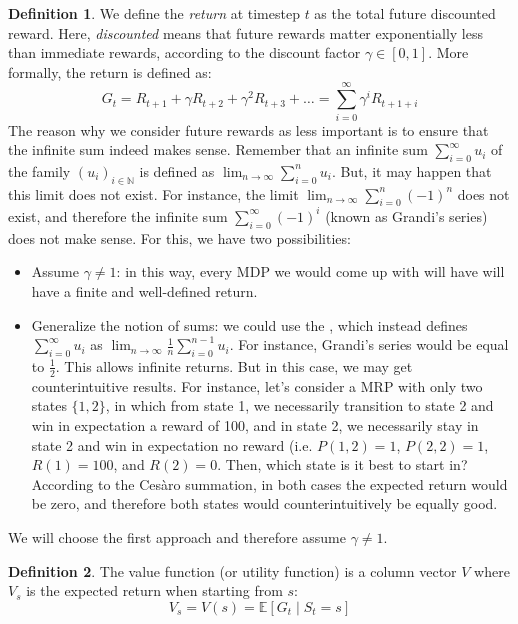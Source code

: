 \documentclass{article}
\theoremstyle{definition}
\newtheorem{definition}{Definition}[section]
\theoremstyle{remark}
\theoremstyle{example}
\begin{document}
\begin{definition}
		We define the \textit{return} at timestep $t$ as the total future discounted reward. Here, \textit{discounted} means that future rewards matter exponentially less than immediate rewards, according to the discount factor $\gamma \in [0, 1]$. More formally, the return is defined as: 
				$$G_t = R_{t+1} + \gamma R_{t+2} + \gamma^2 R_{t+3} + \dots = \sum_{i=0}^\infty \gamma^i R_{t+1+i}$$
		The reason why we consider future rewards as less important is to ensure that the infinite sum indeed makes sense. Remember that an infinite sum $\sum_{i=0}^\infty u_i$ of the family $(u_i)_{i \in \mathbb{N}}$ is defined as $\lim_{n \rightarrow \infty} \sum_{i=0}^n u_i$. But, it may happen that this limit does not exist. For instance, the limit $\lim_{n \rightarrow \infty} \sum_{i=0}^n (-1)^n$ does not exist, and therefore the infinite sum $\sum_{i=0}^\infty (-1)^i$ (known as Grandi's series) does not make sense. For this, we have two possibilities:
		\begin{itemize}
				\item Assume $\gamma \neq 1$: in this way, every MDP we would come up with will have will have a finite and well-defined return.
				\item Generalize the notion of sums: we could use the , which instead defines $\sum_{i=0}^\infty u_i$ as $\lim_{n \rightarrow \infty} \frac{1}{n} \sum_{i=0}^{n-1} u_i$. For instance, Grandi's series would be equal to $\frac{1}{2}$. This allows infinite returns. But in this case, we may get counterintuitive results. For instance, let's consider a MRP with only two states $\{1, 2\}$, in which from state 1, we necessarily transition to state 2 and win in expectation a reward of 100, and in state 2, we necessarily stay in state 2 and win in expectation no reward (i.e. $P(1, 2) = 1$, $P(2, 2) = 1$, $R(1) = 100$, and $R(2) = 0$. Then, which state is it best to start in? According to the Cesàro summation, in both cases the expected return would be zero, and therefore both states would counterintuitively be equally good.
		\end{itemize}
		We will choose the first approach and therefore assume $\gamma \neq 1$.
\end{definition}
		
\begin{definition}
		The value function (or utility function) is a column vector $V$ where $V_s$ is the expected return when starting from $s$:
				$$V_s = V(s) = \mathbb{E}[G_t \mid S_t = s]$$
\end{definition}
\end{document}
